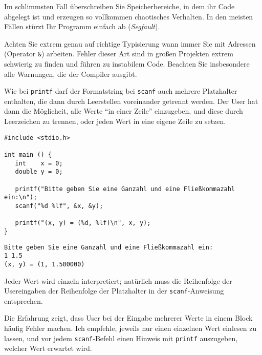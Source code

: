 Im schlimmsten Fall überschreiben Sie Speicherbereiche, in dem ihr Code abgelegt ist und erzeugen so vollkommen chaotisches Verhalten. In den meisten Fällen stürzt Ihr Programm einfach ab (\emph{Segfault}).

\begin{warnbox}[Typisierung]
Achten Sie extrem genau auf richtige Typisierung wann immer Sie mit Adressen (Operator \texttt{\&}) arbeiten. Fehler dieser Art sind in großen Projekten extrem schwierig zu finden und führen zu instabilem Code. Beachten Sie insbesondere alle Warnungen, die der Compiler ausgibt.
\end{warnbox}

Wie bei \texttt{printf} darf der Formatstring bei \texttt{scanf} auch mehrere Platzhalter enthalten, die dann durch Leerstellen voreinander getrennt werden. Der User hat dann die Möglicheit, alle Werte \enquote{in einer Zeile} einzugeben, und diese durch Leerzeichen zu trennen, oder jeden Wert in eine eigene Zeile zu setzen.

\begin{codebox}
\begin{verbatim}
#include <stdio.h>

int main () {
   int    x = 0;
   double y = 0;
   
   printf("Bitte geben Sie eine Ganzahl und eine Fließkommazahl ein:\n");
   scanf("%d %lf", &x, &y);
   
   printf("(x, y) = (%d, %lf)\n", x, y);
}
\end{verbatim}
\end{codebox}

\begin{cmdbox}
\begin{verbatim}
Bitte geben Sie eine Ganzahl und eine Fließkommazahl ein:
1 1.5
(x, y) = (1, 1.500000)
\end{verbatim}
\end{cmdbox}

Jeder Wert wird einzeln interpretiert; natürlich muss die Reihenfolge der Usereingaben der Reihenfolge der Platzhalter in der \texttt{scanf}-Anweisung entsprechen.

\begin{hintbox}
Die Erfahrung zeigt, dass User bei der Eingabe mehrerer Werte in einem Block häufig Fehler machen. Ich empfehle, jeweils nur einen einzelnen Wert einlesen zu lassen, und vor jedem \texttt{scanf}-Befehl einen Hinweis mit \texttt{printf} auszugeben, welcher Wert erwartet wird.
\end{hintbox}

